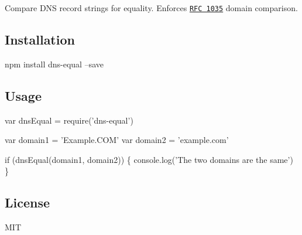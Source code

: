 Compare D\+NS record strings for equality. Enforces \href{https://tools.ietf.org/html/rfc1035}{\tt R\+FC 1035} domain comparison.

\href{https://travis-ci.org/watson/dns-equal}{\tt } \href{https://github.com/feross/standard}{\tt }

\subsection*{Installation}


\begin{DoxyCode}
npm install dns-equal --save
\end{DoxyCode}


\subsection*{Usage}


\begin{DoxyCode}
var dnsEqual = require('dns-equal')

var domain1 = 'Example.COM'
var domain2 = 'example.com'

if (dnsEqual(domain1, domain2)) \{
  console.log('The two domains are the same')
\}
\end{DoxyCode}


\subsection*{License}

M\+IT 